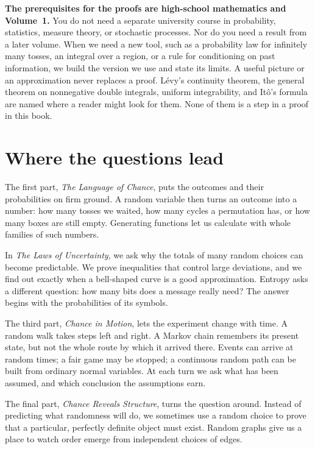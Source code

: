 \textbf{The prerequisites for the proofs are high-school mathematics and Volume~1.} You do not need a separate university course in probability, statistics, measure theory, or stochastic processes. Nor do you need a result from a later volume. When we need a new tool, such as a probability law for infinitely many tosses, an integral over a region, or a rule for conditioning on past information, we build the version we use and state its limits. A useful picture or an approximation never replaces a proof. Lévy's continuity theorem, the general theorem on nonnegative double integrals, uniform integrability, and Itô's formula are named where a reader might look for them. None of them is a step in a proof in this book.

\section*{Where the questions lead}

The first part, \emph{The Language of Chance}, puts the outcomes and their probabilities on firm ground. A random variable then turns an outcome into a number: how many tosses we waited, how many cycles a permutation has, or how many boxes are still empty. Generating functions let us calculate with whole families of such numbers.

In \emph{The Laws of Uncertainty}, we ask why the totals of many random choices can become predictable. We prove inequalities that control large deviations, and we find out exactly when a bell-shaped curve is a good approximation. Entropy asks a different question: how many bits does a message really need? The answer begins with the probabilities of its symbols.

The third part, \emph{Chance in Motion}, lets the experiment change with time. A random walk takes steps left and right. A Markov chain remembers its present state, but not the whole route by which it arrived there. Events can arrive at random times; a fair game may be stopped; a continuous random path can be built from ordinary normal variables. At each turn we ask what has been assumed, and which conclusion the assumptions earn.

The final part, \emph{Chance Reveals Structure}, turns the question around. Instead of predicting what randomness will do, we sometimes use a random choice to prove that a particular, perfectly definite object must exist. Random graphs give us a place to watch order emerge from independent choices of edges.

